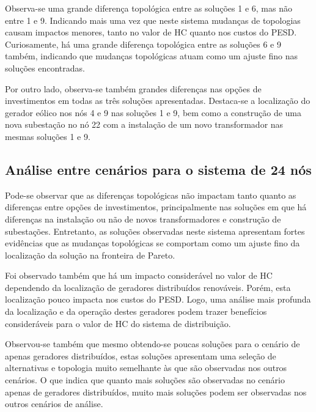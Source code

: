 Observa-se uma grande diferença topológica entre as soluções 1 e 6, mas não entre 1 e 9. Indicando mais uma vez que neste sistema mudanças de topologias causam impactos menores, tanto no valor de \ac{HC} quanto nos custos do \ac{PESD}. Curiosamente, há uma grande diferença topológica entre as soluções 6 e 9 também, indicando que mudanças topológicas atuam como um ajuste fino nas soluções encontradas.

Por outro lado, observa-se também grandes diferenças nas opções de investimentos em todas as três soluções apresentadas. Destaca-se a localização do gerador eólico nos nós 4 e 9 nas soluções 1 e 9, bem como a construção de uma nova subestação no nó 22 com a instalação de um novo transformador nas mesmas soluções 1 e 9.

\subsection{Análise entre cenários para o sistema de 24 nós}

Pode-se observar que as diferenças topológicas não impactam tanto quanto as diferenças entre opções de investimentos, principalmente nas soluções em que há diferenças na instalação ou não de novos transformadores e construção de subestações. Entretanto, as soluções observadas neste sistema apresentam fortes evidências que as mudanças topológicas se comportam como um ajuste fino da localização da solução na fronteira de Pareto.

Foi observado também que há um impacto considerável no valor de \ac{HC} dependendo da localização de geradores distribuídos renováveis. Porém, esta localização pouco impacta nos custos do \ac{PESD}. Logo, uma análise mais profunda da localização e da operação destes geradores podem trazer benefícios consideráveis para o valor de \ac{HC} do sistema de distribuição.

Observou-se também que mesmo obtendo-se poucas soluções para o cenário de apenas geradores distribuídos, estas soluções apresentam uma seleção de alternativas e topologia muito semelhante às que são observadas nos outros cenários. O que indica que quanto mais soluções são observadas no cenário apenas de geradores distribuídos, muito mais soluções podem ser observadas nos outros cenários de análise.

